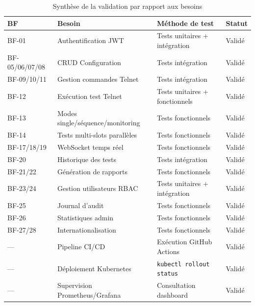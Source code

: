 \begin{table}[H]
  \centering
  \caption{Synthèse de la validation par rapport aux besoins}
  \label{tab:synthese_validation}
  \begin{tabularx}{\textwidth}{C{0.8cm} L{5cm} L{3cm} C{2cm}}
    \toprule
    \textbf{BF} & \textbf{Besoin} & \textbf{Méthode de test} & \textbf{Statut} \\
    \midrule
    BF-01 & Authentification JWT & Tests unitaires + intégration &
      \textcolor{vertCode}{Validé} \\
    BF-05/06/07/08 & CRUD Configuration & Tests intégration &
      \textcolor{vertCode}{Validé} \\
    BF-09/10/11 & Gestion commandes Telnet & Tests intégration &
      \textcolor{vertCode}{Validé} \\
    BF-12 & Exécution test Telnet & Tests unitaires + fonctionnels &
      \textcolor{vertCode}{Validé} \\
    BF-13 & Modes single/séquence/monitoring & Tests fonctionnels &
      \textcolor{vertCode}{Validé} \\
    BF-14 & Tests multi-slots parallèles & Tests fonctionnels &
      \textcolor{vertCode}{Validé} \\
    BF-17/18/19 & WebSocket temps réel & Tests fonctionnels &
      \textcolor{vertCode}{Validé} \\
    BF-20 & Historique des tests & Tests intégration &
      \textcolor{vertCode}{Validé} \\
    BF-21/22 & Génération de rapports & Tests fonctionnels &
      \textcolor{vertCode}{Validé} \\
    BF-23/24 & Gestion utilisateurs RBAC & Tests unitaires + intégration &
      \textcolor{vertCode}{Validé} \\
    BF-25 & Journal d'audit & Tests fonctionnels &
      \textcolor{vertCode}{Validé} \\
    BF-26 & Statistiques admin & Tests fonctionnels &
      \textcolor{vertCode}{Validé} \\
    BF-27/28 & Internationalisation & Tests fonctionnels &
      \textcolor{vertCode}{Validé} \\
    --- & Pipeline CI/CD & Exécution GitHub Actions &
      \textcolor{vertCode}{Validé} \\
    --- & Déploiement Kubernetes & \texttt{kubectl rollout status} &
      \textcolor{vertCode}{Validé} \\
    --- & Supervision Prometheus/Grafana & Consultation dashboard &
      \textcolor{vertCode}{Validé} \\
    \bottomrule
  \end{tabularx}
\end{table}

